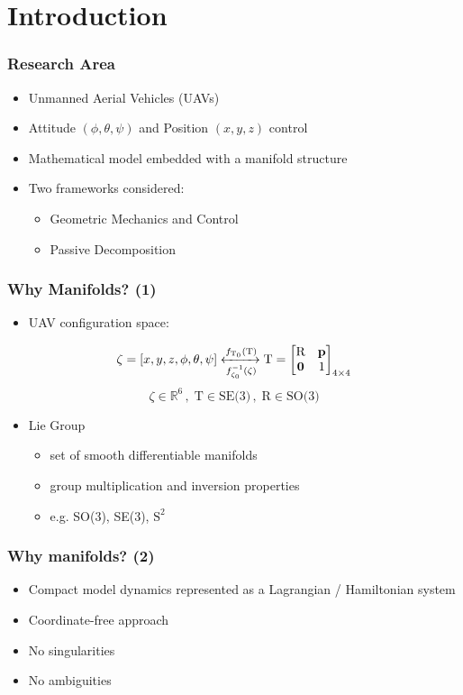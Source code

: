 
\section{Introduction}

\begin{frame}
	\frametitle{Research Area}
	
	\begin{itemize}
		\item Unmanned Aerial Vehicles (UAVs)
		\item Attitude $(\phi, \theta, \psi)$ and Position $(x, y, z)$ control
		\item Mathematical model embedded with a manifold structure
		\item Two frameworks considered:
		
		\begin{itemize}
			\item Geometric Mechanics and Control
			\item Passive Decomposition
		\end{itemize}
	\end{itemize}
\end{frame}

\begin{frame}
	\frametitle{Why Manifolds? (1)}
	
	\begin{itemize}
		\item UAV configuration space:
	\end{itemize}
	\begin{equation}
		\zeta = [x, y, z, \phi, \theta, \psi] 
		\xleftrightarrow[f_{\zeta_0}^{-1}(\zeta)]{f_{\text{T}_0}(\text{T})}
		\text{T} = \begin{bmatrix}
		\text{R} & \textbf{p} \\
		\textbf{0} & 1
		\end{bmatrix}_{4\times 4} 
	\end{equation}
	\begin{equation}
		\zeta \in \mathbb{R}^6  \, , \; \text{T} \in \text{SE(3)} \, , \; \text{R} \in \text{SO(3)}
	\end{equation}
	
	\begin{itemize}
		\item Lie Group
		\begin{itemize}
			\item set of smooth differentiable manifolds
			\item group multiplication and inversion properties
			\item e.g. SO(3), SE(3), $\text{S}^2$
		\end{itemize}
	\end{itemize}
\end{frame}

\begin{frame}
	\frametitle{Why manifolds? (2)}
	
	\begin{itemize}
		\item Compact model dynamics represented as a Lagrangian / Hamiltonian system
		\item Coordinate-free approach
		\item No singularities
		\item No ambiguities
	\end{itemize}
\end{frame}